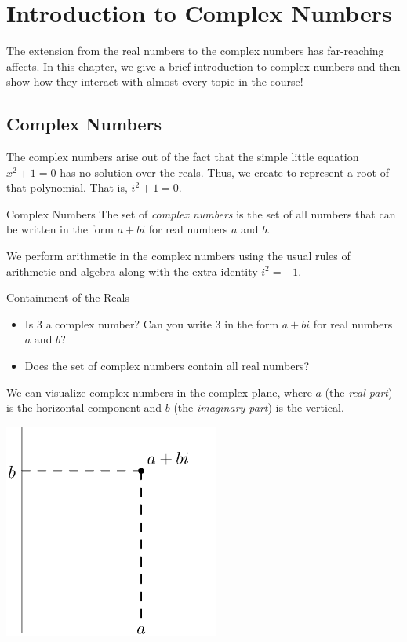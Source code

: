 \chapter{Introduction to Complex Numbers}

The extension from the real numbers to the complex numbers has far-reaching affects.  In this chapter, we give a brief introduction to complex numbers and then show how they interact with almost every topic in the course!

\section{Complex Numbers} 
The complex numbers arise out of the fact that the simple little equation $x^2+1=0$ has no solution over the reals.  Thus, we create  to represent a root of that polynomial.  That is, $i^2+1=0$.  
\begin{definition}{Complex Numbers}  The set of \emph{complex numbers} is the set of all numbers that can be written in the form $a+bi$ for real numbers $a$ and $b$.
\end{definition}

We perform arithmetic in the complex numbers using the usual rules of arithmetic and algebra along with the extra identity $i^2=-1$.

\begin{exercise}{Containment of the Reals \Coffeecup}
\begin{itemize}
\item Is 3 a complex number?  Can you write 3 in the form $a+bi$ for real numbers $a$ and $b$?
\vspace*{.5in}
\item Does the set of complex numbers contain all real numbers?
\vspace*{.5in}
\end{itemize}
\end{exercise}

We can visualize complex numbers in the complex plane, where $a$ (the \emph{real part}) is the horizontal component and $b$ (the \emph{imaginary part}) is the vertical. 

\begin{center} \includegraphics[width=200pt]{ChapterComplex/Figures/complexcart.eps}
\end{center}

